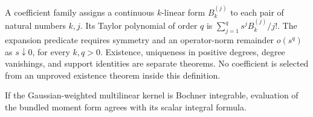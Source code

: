 \begin{definition}
\label{def:moment-coefficients}








A coefficient family assigns a continuous $k$-linear form $B_k^{(j)}$ to each
pair of natural numbers $k,j$. Its Taylor polynomial of order $q$ is
$\sum_{j=1}^q s^j B_k^{(j)}/j!$. The expansion predicate requires symmetry
and an operator-norm remainder $o(s^q)$ as $s\downarrow0$, for every $k,q>0$.
Existence, uniqueness in positive degrees, degree vanishings, and support
identities are separate theorems. No coefficient is selected from an
unproved existence theorem inside this definition.
\end{definition}

\begin{lemma}
\label{lem:moment-form-evaluation}


If the Gaussian-weighted multilinear kernel is Bochner integrable, evaluation of the bundled moment form agrees with its scalar integral formula.
\end{lemma}

